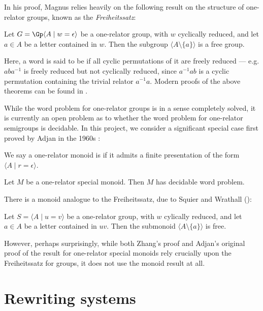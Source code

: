 \documentclass[noindex,noinsetproof,12pt]{lmaths}
\begin{document}
In his proof, Magnus relies heavily on the following result on the structure of one-relator groups, known as the \emph{Freiheitssatz}:

\begin{theorem}[Freiheitssatz] \label{thm:freiheitssatz}
	Let $G = \Gp \langle A \mid w = \epsilon \rangle$ be a one-relator group, with $w$ cyclically reduced, and let $a \in A$ be a letter contained in $w$. Then the subgroup $\langle A \setminus \{a\} \rangle$ is a free group.
\end{theorem}

Here, a word is said to be  if all cyclic permutations of it are freely reduced --- e.g. $aba^{-1}$ is freely reduced but not cyclically reduced, since $a^{-1}ab$ is a cyclic permutation containing the trivial relator $a^{-1}a$. Modern proofs of the above theorems can be found in \cite{Lyndon2001}.

While the word problem for one-relator groups is in a sense completely solved, it is currently an open problem as to whether the word problem for one-relator semigroups is decidable. In this project, we consider a significant special case first proved by Adjan in the 1960s \cite{Adian1966}:

\begin{defn}
We say a one-relator monoid is  if it admits a finite presentation of the form $\langle A \mid r = \epsilon \rangle$.
\end{defn}

\begin{theorem}[Adjan]
	Let $M$ be a one-relator special monoid. Then $M$ has decidable word problem.
\end{theorem}

There is a monoid analogue to the Freiheitssatz, due to Squier and Wrathall (\cite{Squier1983}):
\begin{theorem}
	Let $S = \langle A \mid u = v \rangle$ be a one-relator group, with $w$ cylically reduced, and let $a \in A$ be a letter contained in $uv$. Then the submonoid $\langle A \setminus \{a\} \rangle$ is free.
\end{theorem}
However, perhaps surprisingly, while both Zhang's proof and Adjan's original proof of the result for one-relator special monoids rely crucially upon the Freiheitssatz for groups, it does not use the monoid result at all.


\section{Rewriting systems} \label{sec:rewriting-systems}
\end{document}
